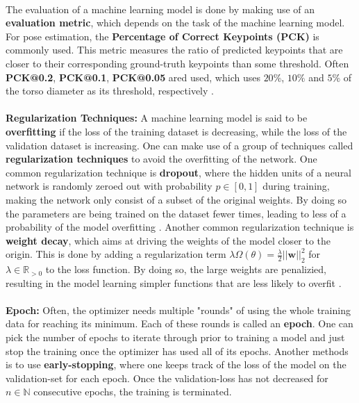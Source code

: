 \documentclass[./main.tex]{subfiles}
\begin{document}
\\
The evaluation of a machine learning model is done by making use of an \textbf{evaluation metric}, which depends on the task of the machine learning model. For pose estimation, the \textbf{Percentage of Correct Keypoints (PCK)} is commonly used. This metric measures the ratio of predicted keypoints that are closer to their corresponding ground-truth keypoints than some threshold. Often \textbf{PCK@0.2}, \textbf{PCK@0.1}, \textbf{PCK@0.05} ared used, which uses $20\%$, $10\%$ and $5\%$ of the torso diameter as its threshold, respectively \cite{https://doi.org/10.48550/arxiv.2001.08095}.
\\
\\
\noindent \textbf{Regularization Techniques:} A machine learning model is said to be \textbf{overfitting} if the loss of the training dataset is decreasing, while the loss of the validation dataset is increasing. One can make use of a group of techniques called \textbf{regularization techniques} to avoid the overfitting of the network. One common regularization technique is \textbf{dropout}, where the hidden units of a neural network is randomly zeroed out with probability $p \in [0, 1]$ during training, making the network only consist of a subset of the original weights. By doing so the parameters are being trained on the dataset fewer times, leading to less of a probability of the model overfitting \cite{d2l}. Another common regularization technique is \textbf{weight decay}, which aims at driving the weights of the model closer to the origin. This is done by adding a regularization term $\lambda \Omega(\theta) = \frac{\lambda}{2} || \bm{w} ||^2 _2$ for $\lambda \in \mathbb{R}_{> 0}$ to the loss function. By doing so, the large weights are penalizied, resulting in the model learning simpler functions that are less likely to overfit \cite{DL_book}.
\\
\\
\noindent \textbf{Epoch:} Often, the optimizer needs multiple "rounds" of using the whole training data for reaching its minimum. Each of these rounds is called an \textbf{epoch}. One can pick the number of epochs to iterate through prior to training a model and just stop the training once the optimizer has used all of its epochs. Another methods is to use \textbf{early-stopping}, where one keeps track of the loss of the model on the validation-set for each epoch. Once the validation-loss has not decreased for $n \in \mathbb{N}$ consecutive epochs, the training is terminated.
\end{document}
